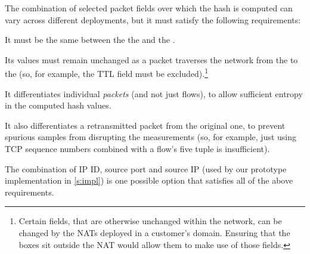 

The combination of selected packet fields over which the hash is computed can vary across different deployments, but it must satisfy the following requirements: 

 It must be the same between the the \inbox and the \outbox.

 Its values must remain unchanged as a packet traverses the network from the \inbox to the \outbox (so, for example, the TTL field must be excluded).\footnote{Certain fields, that are otherwise unchanged within the network, can be changed by the NATs deployed in a customer's domain. Ensuring that the \name boxes sit outside the NAT would allow them to make use of those fields.} 

 It differentiates individual \emph{packets} (and not just flows), to allow sufficient entropy in the computed hash values.

 It also differentiates a retransmitted packet from the original one, to prevent spurious samples from disrupting the measurements (so, for example, just using TCP sequence numbers combined with a flow's five tuple is insufficient).

The combination of IP ID, source port and source IP (used by our prototype implementation in \ref{s:impl}) is one possible option that satisfies all of the above requirements.  

